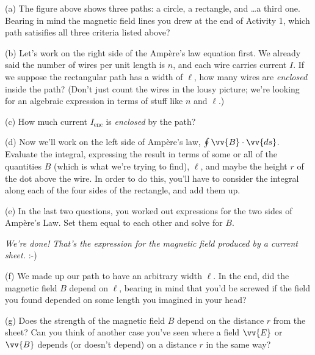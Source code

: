 (a) The figure above shows three paths: a circle, a rectangle, and \ldots a third one.  Bearing in mind the magnetic field lines you drew at the end of Activity 1, which path satisifies all three criteria listed above?
\answerspace{0.3in}

\pagebreak[3]
(b) Let's work on the right side of the Amp\`ere's law equation first.  We already said the number of wires per unit length is $n$, and each wire carries current $I$.  If we suppose the rectangular path has a width of $\ell$, how many wires are \textit{enclosed} inside the path?  (Don't just count the wires in the lousy picture; we're looking for 
an algebraic expression in terms of stuff like $n$ and $\ell$.)
\answerspace{0.3in}

(c) How much current $I_\text{enc}$ is \textit{enclosed} by the path?
\answerspace{0.5in}

(d) Now we'll work on the left side of Amp\`ere's law, $\oint \vv {B}\cdot \vv{ds}$.  Evaluate the integral, 
expressing the result in terms of some
or all of the quantities $B$ (which is what we're trying
to find), $\ell$, and maybe the height $r$ of the dot above the wire.  In order to do this, you'll have to consider
the integral along each of the four sides of the rectangle,
and add them up.
\answerspace{1.3in}

(e) In the last two questions, you worked out expressions
for the two sides of Amp\`ere's Law. Set them equal to each other
and solve for $B$.
\answerspace{1in}

\centerline{\textit{We're done! That's the expression for the magnetic field produced 
by a current sheet.}  :-)}

(f) We made up our path to have an arbitrary width $\ell$.  In the end, did the magnetic field $B$ depend on $\ell$, bearing in mind that you'd be screwed if the field you found depended on some length you imagined in your head?
\answerspace{0.4in}

(g) Does the strength of the magnetic field $B$ depend on the
distance $r$ from the sheet?  Can you think of another case you've seen where a field $\vv{E}$ or $\vv{B}$ depends (or doesn't depend) on a distance $r$ in the same way?
\answerspace{0.4in}
